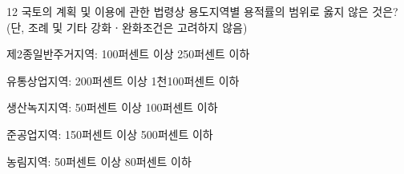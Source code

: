 \begin{question}{12}
국토의 계획 및 이용에 관한 법령상 용도지역별 용적률의 범위로 옳지 않은 것은? (단, 조례 및 기타 강화ㆍ완화조건은 고려하지 않음)
\begin{choices}
  \item 제2종일반주거지역: 100퍼센트 이상 250퍼센트 이하
  \item 유통상업지역: 200퍼센트 이상 1천100퍼센트 이하
  \item 생산녹지지역: 50퍼센트 이상 100퍼센트 이하
  \item 준공업지역: 150퍼센트 이상 500퍼센트 이하
  \item 농림지역: 50퍼센트 이상 80퍼센트 이하
\end{choices}
\end{question}
